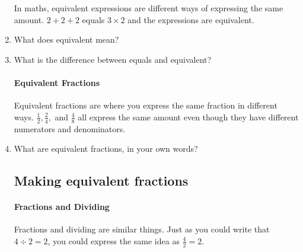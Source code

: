 \documentclass[14pt]{article}
\begin{document}
\begin{enumerate}
In maths, equivalent expressions are different ways of expressing the same amount. $2+2+2$ equals $3\times2$ and the expressions are equivalent.

\item What does equivalent mean?
\item What is the difference between equals and equivalent?

\paragraph{Equivalent Fractions}
Equivalent fractions are where you express the same fraction in different ways. $\frac{1}{2}, \frac{2}{4},$ and $\frac{4}{8}$ all express the same amount even though they have different numerators and denominators.


\item What are equivalent fractions, in your own words?

\newpage

\subsection*{Making equivalent fractions}

\paragraph{Fractions and Dividing}
Fractions and dividing are similar things. Just as you could write that $4\div2=2$, you could express the same idea as $\frac{4}{2}=2$.
 

\end{enumerate}
\end{document}
